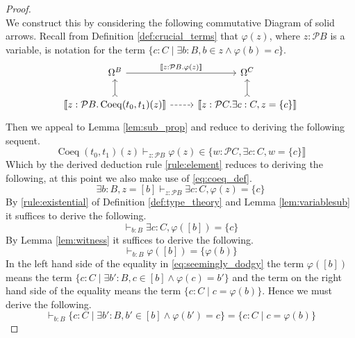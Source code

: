 \documentclass{birkjour}
\theoremstyle{plain}
\theoremstyle{definition}
\newcommand{\call}[1]{\mathcal{#1}}
\begin{document}
\begin{proof}
\begin{equation}
		\end{equation}
		We construct this by considering the following commutative Diagram of solid arrows. Recall from Definition \ref{def:crucial_terms} that $\varphi(z)$, where $z:\call{P}B$ is a variable, is notation for the term $\lbrace c:C \mid \exists b:B, b \in z \wedge \varphi(b) = c\rbrace$.
		\begin{equation}\label{eq:coeq_embedding}
			\begin{tikzcd}
				\Omega^B\arrow[r,"{\llbracket z:\call{P}B. \varphi(z)\rrbracket}"] & \Omega^C\\
				\llbracket z: \call{P}B . \operatorname{Coeq}(t_0,t_1)(z)\rrbracket\arrow[u,rightarrowtail]\arrow[r,dashed] & \llbracket z: \call{P}C. \exists c: C, z = \lbrace c \rbrace \rrbracket\arrow[u,rightarrowtail]
			\end{tikzcd}
		\end{equation}
		Then we appeal to Lemma \ref{lem:sub_prop} and reduce to deriving the following sequent.
		\begin{equation}
			\operatorname{Coeq}(t_0,t_1)(z)\vdash_{z:\call{P}B}\varphi(z) \in \lbrace w: \call{P}C, \exists c:C, w = \lbrace c \rbrace\rrbracket
		\end{equation}
		Which by the derived deduction rule \eqref{rule:element} reduces to deriving the following, at this point we also make use of \eqref{eq:coeq_def}.
		\begin{equation}
			\exists b:B, z = [b] \vdash_{z: \call{P}B}\exists c:C, \varphi(z) = \lbrace c \rbrace
		\end{equation}
		By \eqref{rule:existential} of Definition \ref{def:type_theory} and Lemma \ref{lem:variablesub} it suffices to derive the following.
		\begin{equation}
			\vdash_{b:B}\exists c:C, \varphi([b]) = \lbrace c \rbrace
		\end{equation}
		By Lemma \ref{lem:witness} it suffices to derive the following.
		\begin{equation}\label{eq:seemingly_dodgy}
			\vdash_{b:B}\varphi([b]) = \lbrace \varphi(b)\rbrace
		\end{equation}
		In the left hand side of the equality in \eqref{eq:seemingly_dodgy} the term $\varphi([b])$ means the term $\lbrace c:C \mid \exists b':B, c \in [b] \wedge \varphi(c) = b'\rbrace$ and the term on the right hand side of the equality means the term $\lbrace c :C \mid c = \varphi(b) \rbrace$. Hence we must derive the following.
		\begin{equation}
			\vdash_{b:B} \lbrace c:C \mid \exists b':B, b' \in [b] \wedge \varphi(b') = c\rbrace = \lbrace c :C \mid c = \varphi(b) \rbrace

\end{equation}
\end{proof}
\end{document}
